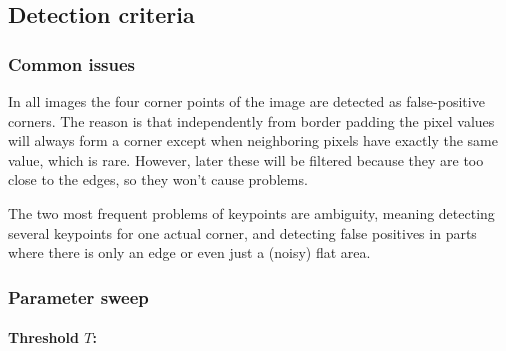 \documentclass[10pt,a4paper,twoside]{article}
\begin{document}
\subsection{Detection criteria}

\subsubsection*{Common issues}
In all images the four corner points of the image are detected as false-positive corners. The
reason is that independently from border padding the pixel values will always
form a corner except when neighboring pixels have exactly the same value, which
is rare. However, later these will be filtered because they are too close to the
edges, so they won't cause problems. \par

The two most frequent problems of keypoints are ambiguity, meaning detecting
several keypoints for one actual corner, and detecting false positives in parts
where there is only an edge or even just a (noisy) flat area.


\subsubsection*{Parameter sweep}

\paragraph*{Threshold $T$:}
\end{document}
